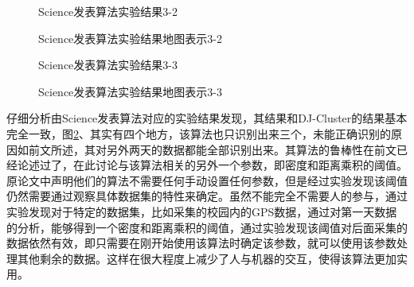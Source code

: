 \begin{figure}[htb]
  \centering%
  \hspace{4em}%
  \caption{Science发表算法实验结果3-2}
  \label{fig:3_12_2}
\end{figure}
\begin{figure}[htb]
  \centering%
  \hspace{4em}%
  \caption{Science发表算法实验结果地图表示3-2}
  \label{fig:3_13_2}
\end{figure}
\begin{figure}[htb]
  \centering%
  \hspace{4em}%
  \caption{Science发表算法实验结果3-3}
  \label{fig:3_12_3}
\end{figure}
\begin{figure}[htb]
  \centering%
  \hspace{4em}%
  \caption{Science发表算法实验结果地图表示3-3}
  \label{fig:3_13_3}
\end{figure}
\par 仔细分析由Science发表算法对应的实验结果发现，其结果和DJ-Cluster的结果基本完全一致，图\ref{fig:3_13_2}、其实有四个地方，该算法也只识别出来三个，未能正确识别的原因如前文所述，其对另外两天的数据都能全部识别出来。其算法的鲁棒性在前文已经论述过了，在此讨论与该算法相关的另外一个参数，即密度和距离乘积的阈值。原论文中声明他们的算法不需要任何手动设置任何参数，但是经过实验发现该阈值仍然需要通过观察具体数据集的特性来确定。虽然不能完全不需要人的参与，通过实验发现对于特定的数据集，比如采集的校园内的GPS数据，通过对第一天数据的分析，能够得到一个密度和距离乘积的阈值，通过实验发现该阈值对后面采集的数据依然有效，即只需要在刚开始使用该算法时确定该参数，就可以使用该参数处理其他剩余的数据。这样在很大程度上减少了人与机器的交互，使得该算法更加实用。
